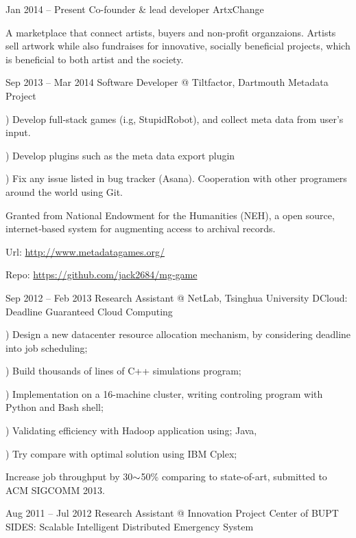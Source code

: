 \documentclass{tccv}
\begin{document}
\begin{eventlist}

\item{Jan 2014 -- Present}
     {Co-founder \& lead developer}
     {ArtxChange}
     
     A marketplace that connect artists, buyers and non-profit organzaions. Artists sell artwork while also fundraises for innovative, socially beneficial projects, which is beneficial to both artist and the society.

\item{Sep 2013 -- Mar 2014}
     {Software Developer @ Tiltfactor, Dartmouth}
     {Metadata Project}
     
     ) Develop full-stack games (i.g, StupidRobot), and collect meta data from user's input.
     
     ) Develop plugins such as the meta data export plugin
     
     ) Fix any issue listed in bug tracker (Asana). Cooperation with other programers around the world using Git.
     
     Granted from National Endowment for the Humanities (NEH), a open source, internet‐based system for augmenting access to archival records.

      Url: \underline{http://www.metadatagames.org/}

      Repo:  \underline{https://github.com/jack2684/mg-game}

     
     
\item{Sep 2012 -- Feb 2013}
     {Research Assistant @ NetLab, Tsinghua University}
     {DCloud: Deadline Guaranteed Cloud Computing}
     
     ) Design a new datacenter resource allocation mechanism, by considering deadline into job scheduling;
     
     ) Build thousands of lines of C++ simulations program;
     
     ) Implementation on a 16-machine cluster, writing controling  program with Python and Bash shell;
     
     ) Validating efficiency with Hadoop application using; Java, 
     
     ) Try compare with optimal solution using IBM Cplex;

     Increase job throughput by 30$\scriptsize{\sim}$50\% comparing to state-of-art, submitted to ACM SIGCOMM 2013.
     
\item{Aug 2011 -- Jul 2012}
     {Research Assistant @ Innovation Project Center of BUPT}
     {SIDES: Scalable Intelligent Distributed Emergency System}
     

\end{eventlist}
\end{document}
